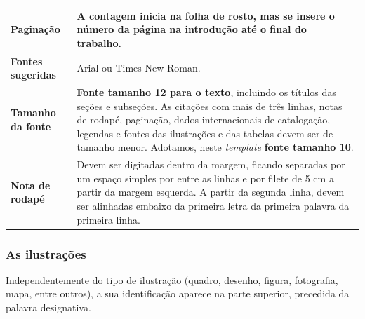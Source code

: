 \begin{quadro}[htb]
\begin{tabular}{|l|p{11cm}|}
		\textbf{Paginação}        & A contagem inicia na folha de rosto, mas se \textbf{insere o número da página na introdução} até o final do trabalho.                                                                                                                                                                                                                                                                                                               \\ \hline
		\textbf{Fontes sugeridas} & Arial ou Times New Roman.                                                                                                                                                                                                                                                                                                                                                                                                           \\ \hline
		\textbf{Tamanho da fonte} & \textbf{Fonte tamanho 12 para o texto}, incluindo os títulos das seções e subseções. As citações com mais de três linhas, notas de rodapé, paginação, dados internacionais de catalogação, legendas e fontes das ilustrações e das tabelas devem ser de tamanho menor. Adotamos, neste \textit{template} \textbf{fonte tamanho 10}.                                                                                                 \\ \hline
		\textbf{Nota de rodapé}   & Devem ser digitadas dentro da margem, ficando separadas por um espaço simples por entre as linhas e por filete de 5 cm a partir da margem esquerda. A partir da segunda linha, devem ser alinhadas embaixo da primeira letra da primeira palavra da primeira linha.                                                                                                                                                                 \\ \hline
	\end{tabular}
\end{quadro}


\subsubsection{As ilustrações}

Independentemente do tipo de ilustração (quadro, desenho, figura, fotografia, mapa, entre outros), a sua identificação aparece na parte superior, precedida da palavra designativa.

